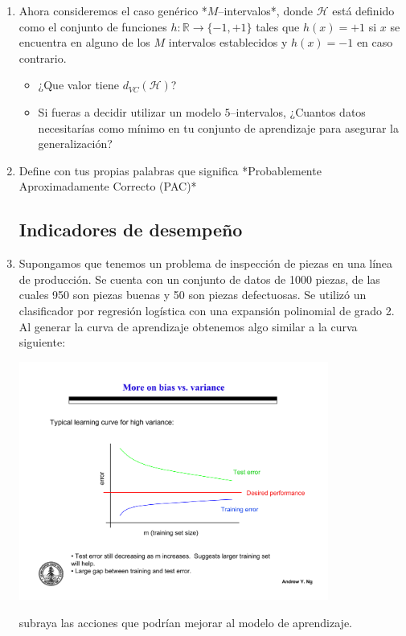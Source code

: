 \documentclass[11pt]{article}
\begin{document}
\begin{enumerate}
\vspace{3mm}

\item Ahora consideremos el caso genérico *$M$--intervalos*, donde $\mathcal{H}$ está definido como el conjunto de funciones $h: \mathbb{R} \to \{-1, +1\}$ tales que $h(x) = +1$ si $x$ se encuentra en alguno de los $M$ intervalos establecidos y $h(x) = -1$ en caso contrario.

\vspace{3mm}

\begin{itemize}
    \item ¿Que valor tiene $d_{VC}(\mathcal{H})$?
    \vspace{3mm}
    \item Si fueras a decidir utilizar un modelo $5$--intervalos, ¿Cuantos datos necesitarías como mínimo en tu conjunto de aprendizaje para asegurar la generalización?
\end{itemize}

\vspace{3mm}

\item Define con tus propias palabras que significa *Probablemente Aproximadamente Correcto (PAC)*

\newpage



\subsection*{Indicadores de desempeño}

\item Supongamos que tenemos un problema de inspección de piezas en una línea de producción. Se cuenta con un conjunto de datos de 1000 piezas, de las cuales 950 son piezas buenas y 50 son piezas defectuosas. Se utilizó un clasificador por regresión logística con una expansión polinomial de grado 2. Al generar la curva de aprendizaje obtenemos algo similar a la curva siguiente:

\begin{center}
  \includegraphics[width = 0.8\textwidth]{h_var.pdf}
\end{center}
subraya las acciones que podrían mejorar al modelo de aprendizaje.


\end{enumerate}
\end{document}
